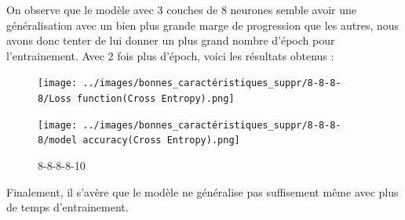 \vspace{1cm}

On observe que le modèle avec 3 couches de 8 neurones semble avoir une généralisation avec un bien plus grande marge de progression que
les autres, nous avons donc tenter de lui donner un plus grand nombre d'époch pour l'entrainement.
Avec 2 fois plus d'époch, voici les résultats obtenus :

\vspace{1cm}


\begin{figure}[!htb]
    \begin{minipage}{0.5\textwidth}
        \centering
        \texttt{[image: ../images/bonnes\_caractéristiques\_suppr/8-8-8-8/Loss function(Cross Entropy).png]}
        \label{fig:8-8-8-8-10.3}
    \end{minipage}\hfill
    \begin{minipage}{0.5\textwidth}
        \centering
        \texttt{[image: ../images/bonnes\_caractéristiques\_suppr/8-8-8-8/model accuracy(Cross Entropy).png]}
        \label{fig:8-8-8-8-10.4}
    \end{minipage}
    \caption{8-8-8-8-10}
\end{figure}

\vspace{1cm}

Finalement, il s'avère que le modèle ne généralise pas suffisement même avec plus de temps d'entrainement.


\newpage